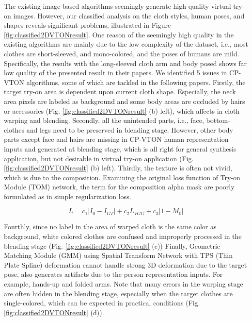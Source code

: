 The existing image based algorithms seemingly generate high quality virtual try-on images. However, our classified analysis on the cloth styles, human poses, and shapes reveals significant problems, illustrated in Figure \ref{fig:classified2DVTONresult}. One reason of the seemingly high quality in the existing algorithms are mainly due to the low complexity of the dataset, i.e., most clothes are short-sleeved, and mono-colored, and the poses of humans are mild. Specifically, the results with the long-sleeved cloth arm and body posed shows far low quality of the presented result in their papers. We identified 5 issues in CP-VTON\cite{Wang2018TowardCI} algorithms, some of which are tackled in the following papers. Firstly, the target try-on area is dependent upon current cloth shape. Especially, the neck area pixels are labeled as background and some body areas are occluded by hairs or accessories (Fig. \ref{fig:classified2DVTONresult} (b) left), which affects in cloth warping and blending. Secondly, all the unintended parts, i.e., face, bottom-clothes and legs need to be preserved in blending stage. However, other body parts except face and hairs are missing in CP-VTON\cite{Wang2018TowardCI} human representation inputs and generated at blending stage, which is all right for general synthesis application, but not desirable in virtual try-on application (Fig. \ref{fig:classified2DVTONresult} (b) left). Thirdly, the texture is often not vivid, which is due to the composition. Examining the original loss function of Try-on Module (TOM) network, the term for the composition alpha mask are poorly formulated as in simple regularization loss.   

\begin{equation}
L = c_1 | I_0-I_{GT} |+  c_2 L_{VGG}+c_3 |1-M_0 |        
\end{equation} 

Fourthly, since no label in the area of warped cloth is the same color as background, white colored clothes are confused and improperly processed in the blending stage (Fig. \ref{fig:classified2DVTONresult} (c))
Finally, Geometric Matching Module (GMM) using Spatial Transform Network\cite{JaderbergSZK15} with TPS (Thin Plate Spline)\cite{Bookstein1989PrincipalWT} deformation cannot handle strong 3D deformation due to the target pose, also  generates artifacts due to the person representation inputs. For example, hands-up and folded arms.  Note that many errors in the warping stage are often hidden in the blending stage, especially when the target clothes are single-colored, which can be expected in practical conditions (Fig. \ref{fig:classified2DVTONresult} (d)).

